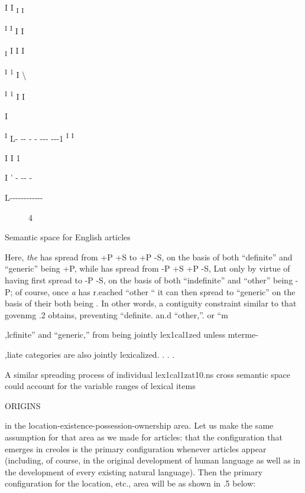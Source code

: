 I I \textsubscript{I }\textsubscript{I}

\textsuperscript{I }\textsuperscript{I }I I 

\textsubscript{I }I I I

\textsuperscript{I }\textsuperscript{1 }I {\textbackslash}

\textsuperscript{I }\textsuperscript{1 }I I 

I

\textsuperscript{I }L- {}-{}- {}- {}- {}-{}-{}- {}-{}-{}-1 \textsuperscript{I }\textsuperscript{I} 

I I 1 

I ' - {}-{}- - 

L-{}-{}-{}-{}-{}-{}-{}-{}-{}-{}-{}-

\begin{figure}
\caption{4}
\label{fig:4}
\end{figure}

Semantic space for English articles

Here, \textit{the} has spread from +P +S to +P -S, on the basis of both ``defi\-nite'' and ``generic'' being +P, while has spread from {}-P +S +P {}-S, Lut only by virtue of having first spread to {}-P {}-S, on the basis of both ``indefinite'' and ``other'' being {}-P; of course, once \textit{a} has r.eached ``other `` it can then spread to ``generic'' on the basis of their both being . In other words, a contiguity constraint similar to that goven\-mg .2 obtains, preventing ``definite{\textquotedbl}. an.d ``other,''. or ``m\-

,lcfinite'' and ``generic,'' from being jointly lex1cal1zed unless mterme-

,liate categories are also jointly lexicalized. . . .

A similar spreading process of individual lex1cal1zat10.ns cross semantic space could account for the variable ranges of lexical items

  


 


ORIGINS

in the location-existence-possession-ownership area. Let us make the same assumption for that area as we made for articles: that the con\-figuration that emerges in creoles is the primary configuration whenever articles appear (including, of course, in the original development of human language as well as in the development of every existing natural language). Then the primary configuration for the location, etc., area will be as shown in .5 below:

